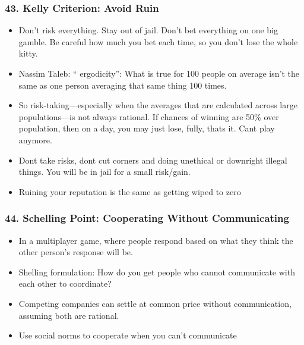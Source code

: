 \begin{frame}[fragile]
\frametitle{43. Kelly Criterion: Avoid Ruin}
\begin{itemize}
\item  Don’t risk everything. Stay out of jail. Don’t bet everything on one big gamble. Be careful how
much you bet each time, so you don’t lose the whole kitty.
\item Nassim Taleb: `` ergodicity'': What is true
for 100 people on average isn’t the same as one person averaging that same thing 100 times.
\item So risk-taking—especially when the averages that are
calculated across large populations—is not always rational. If chances of winning are 50\% over population, then on a day, you may just lose, fully, thats it. Cant play anymore.
\item Dont take risks,  dont cut corners and doing unethical or downright illegal things. You will be in jail for a small risk/gain.
\item Ruining your reputation is the same as getting wiped to zero
\end{itemize}
\end{frame}

\begin{frame}[fragile]
\frametitle{44. Schelling Point: Cooperating Without Communicating}
\begin{itemize}
\item In a multiplayer game, where people respond based on what they think the other person’s
response will be.
\item Shelling formulation:  How do you get people who
cannot communicate with each other to coordinate?
\item Competing companies can settle at common price without communication, assuming both are rational.
\item Use social norms to cooperate when you can’t communicate
\end{itemize}
\end{frame}

